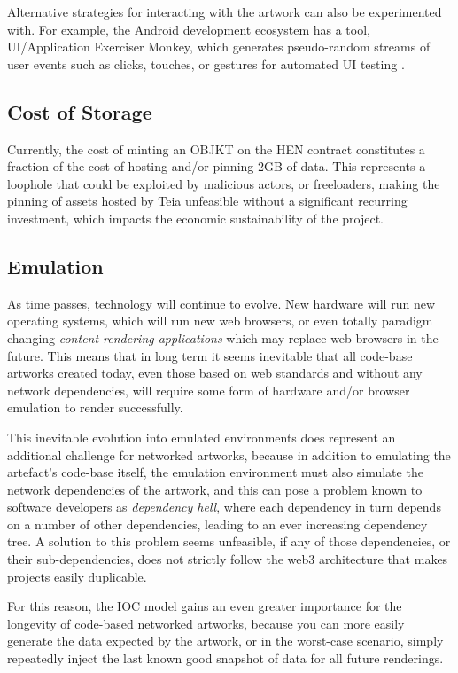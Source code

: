 Alternative strategies for interacting with the artwork can also be experimented with. For example, the Android development ecosystem has a tool, UI/Application Exerciser Monkey, which generates pseudo-random streams of user events such as clicks, touches, or gestures for automated UI testing \cite{UIApplicationExerciser}.

\subsection{Cost of Storage}

Currently, the cost of minting an OBJKT on the HEN contract constitutes a fraction of the cost of hosting and/or pinning 2GB of data. This represents a loophole that could be exploited by malicious actors, or freeloaders, making the pinning of assets hosted by Teia unfeasible without a significant recurring investment, which impacts the economic sustainability of the project.

\subsection{Emulation}

As time passes, technology will continue to evolve. New hardware will run new operating systems, which will run new web browsers, or even totally paradigm changing \emph{content rendering applications} which may replace web browsers in the future. This means that in long term it seems inevitable that all code-base artworks created today, even those based on web standards and without any network dependencies, will require some form of hardware and/or browser emulation to render successfully. 

This inevitable evolution into emulated environments does represent an additional challenge for networked artworks, because in addition to emulating the artefact's code-base itself, the emulation environment must also simulate the network dependencies of the artwork, and this can pose a problem known to software developers as \emph{dependency hell}, where each dependency in turn depends on a number of other dependencies, leading to an ever increasing dependency tree. A solution to this problem seems unfeasible, if any of those dependencies, or their sub-dependencies, does not strictly follow the web3 architecture that makes projects easily duplicable.

For this reason, the IOC model gains an even greater importance for the longevity of code-based networked artworks, because you can more easily generate the data expected by the artwork, or in the worst-case scenario, simply repeatedly inject the last known good snapshot of data for all future renderings.

